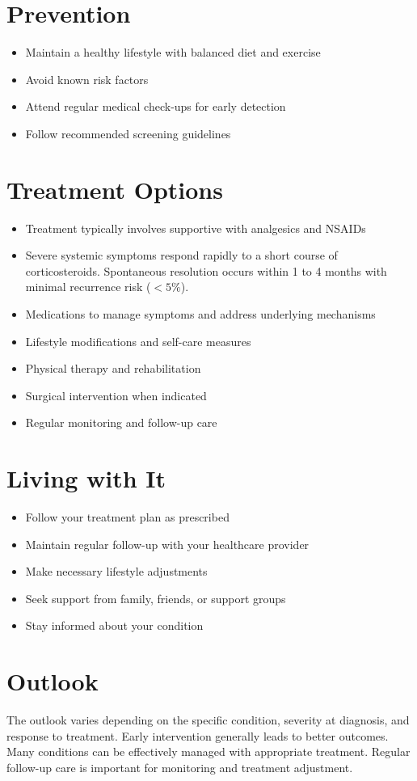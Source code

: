 \section{Prevention}
\begin{itemize}[noitemsep]
  \item Maintain a healthy lifestyle with balanced diet and exercise
  \item Avoid known risk factors
  \item Attend regular medical check-ups for early detection
  \item Follow recommended screening guidelines
\end{itemize}
\section{Treatment Options}
\begin{itemize}[noitemsep]
  \item Treatment typically involves supportive with analgesics and NSAIDs
  \item Severe systemic symptoms respond rapidly to a short course of corticosteroids. Spontaneous resolution occurs within 1 to 4 months with minimal recurrence risk ($<5\%$).
  \item Medications to manage symptoms and address underlying mechanisms
  \item Lifestyle modifications and self-care measures
  \item Physical therapy and rehabilitation
  \item Surgical intervention when indicated
  \item Regular monitoring and follow-up care
\end{itemize}
\section{Living with It}
\begin{itemize}[noitemsep]
  \item Follow your treatment plan as prescribed
  \item Maintain regular follow-up with your healthcare provider
  \item Make necessary lifestyle adjustments
  \item Seek support from family, friends, or support groups
  \item Stay informed about your condition
\end{itemize}
\section{Outlook}
The outlook varies depending on the specific condition, severity at diagnosis, and response to treatment. Early intervention generally leads to better outcomes. Many conditions can be effectively managed with appropriate treatment. Regular follow-up care is important for monitoring and treatment adjustment.
